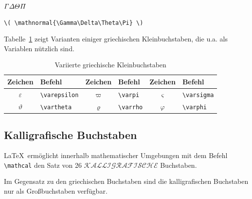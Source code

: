 \documentclass[a4paper,10pt,twoside]{scrbook}
\begin{document}
\begin{minipage}[c]{.4\textwidth}
\setlength{\parskip}{1em}
\centering
\( \mathnormal{\Gamma\Delta\Theta\Pi} \)
\end{minipage}
\hfill
\begin{minipage}[c]{.58\textwidth}
\setlength{\parskip}{1em}
\begin{lstlisting}[label=mathnormalbeispiel, style=customlatex]
\( \mathnormal{\Gamma\Delta\Theta\Pi} \)
\end{lstlisting}
\end{minipage}

Tabelle~\ref{Tabelle_Griechische_Buchstaben3} zeigt Varianten einiger 
griechischen Kleinbuchstaben, die u.a. als Variablen nützlich sind.


\begin{table}[h!tb]
\centering
\caption{Variierte griechische Kleinbuchstaben}
\label{Tabelle_Griechische_Buchstaben3}       %
\begin{tabular}{clclcl}
\hline
Zeichen & Befehl & Zeichen & Befehl & Zeichen & Befehl \\
\hline
$\varepsilon$ & \texttt{\textbackslash varepsilon} &
$\varpi$ & \texttt{\textbackslash varpi} &
$\varsigma$ & \texttt{\textbackslash varsigma}\\
$\vartheta$ & \texttt{\textbackslash vartheta} &
$\varrho$ & \texttt{\textbackslash varrho} &
$\varphi$ & \texttt{\textbackslash varphi} \\
\hline
\end{tabular}
\end{table}


\subsection{Kalligrafische Buchstaben}

\LaTeX\ ermöglicht innerhalb mathematischer Umgebungen mit dem 
Befehl \verb!\mathcal!
den Satz von 26 $\mathcal{KALLIGRAFISCHE}$ Buchstaben. 


Im Gegensatz zu den griechischen
Buchstaben sind die kalligrafischen Buchstaben nur als Großbuchstaben verfügbar.
\end{document}
